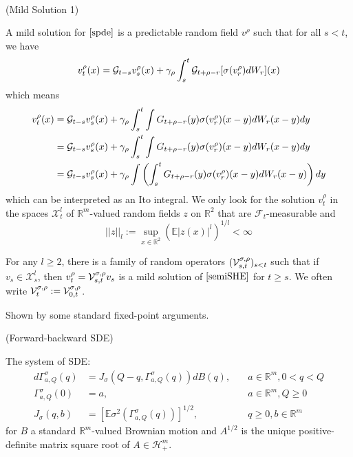 \begin{definition}\ \par
    (Mild Solution 1)\par
    A mild solution for $\eqref{spde}$ is a predictable random field $v^{\rho}$ such that for all $s<t$, we have
    \[
    v^{\rho}_t(x) = \mathcal{G}_{t-s}v_s^{\rho}(x) + \gamma_{\rho}\int_s^t\mathcal{G}_{t+\rho-r}[\sigma(v_r^{\rho})dW_r](x)
    \]
    which means
    \[
    \begin{aligned}
        v_t^\rho(x) &= \mathcal{G}_{t-s}v_s^{\rho}(x) + \gamma_{\rho}\int_s^t \int G_{t+\rho-r}(y)\sigma(v_r^{\rho})(x-y)dW_r(x-y)dy \\
        &=\mathcal{G}_{t-s}v_s^{\rho}(x) + \gamma_{\rho}\int_s^t \int G_{t+\rho-r}(y)\sigma(v_r^{\rho})(x-y)dW_r(x-y)dy \\
        &=\mathcal{G}_{t-s}v_s^{\rho}(x) + \gamma_{\rho}\int\left(\int_s^t G_{t+\rho-r}(y)\sigma(v_r^{\rho})(x-y)dW_r(x-y)\right)dy 
    \end{aligned}
    \]
    which can be interpreted as an Ito integral. We only look for the solution $v_t^{\rho}$ in the spaces $\mathscr{X}_t^l$ of $\mathbb{R}^m$-valued random fields $z$ on $\mathbb{R}^2$ that are $\mathcal{F}_t$-measurable and 
    \[||z||_l:=\sup_{x\in\mathbb{R}^2}(\mathbb{E}|z(x)|^l)^{1/l} < \infty\]
\end{definition}

\begin{proposition}
    For any $l\geq 2$, there is a family of random operators $(\mathcal{V}^{\sigma,\rho}_{s,t})_{s<t}$ such that if $v_s \in \mathscr{X}_s^l$, then $v_t^{\rho} = \mathcal{V}^{\sigma,\rho}_{s,t} v_s$ is a mild solution of $\eqref{semiSHE}$ for $t\geq s$. We often write $\mathcal{V}^{\sigma,\rho}_t := \mathcal{V}^{\sigma,\rho}_{0,t}$. 
\end{proposition}

Shown by some standard fixed-point arguments.

\begin{definition}
    (Forward-backward SDE)\ \par
    The system of SDE:
    \[
    \begin{aligned}
        d\Gamma^{\sigma}_{a,Q}(q) &= J_{\sigma}(Q-q,\Gamma^{\sigma}_{a,Q}(q))dB(q),\quad &a\in\mathbb{R}^m, 0 < q <Q \\
        \Gamma^{\sigma}_{a,Q}(0) &= a, &a\in\mathbb{R}^m,Q\geq0 \\
        J_{\sigma}(q,b) &= [\mathbb{E}\sigma^2(\Gamma^{\sigma}_{a,Q}(q))]^{1/2},&q\geq 0,b\in \mathbb{R}^m
    \end{aligned}\label{fbsde}
    \]
    for $B$ a standard $\mathbb{R}^m$-valued Brownian motion and $A^{1/2}$ is the unique positive-definite matrix square root of $A\in \mathcal{H}^{m}_+$.
\end{definition}

